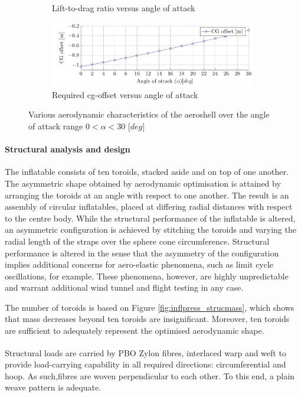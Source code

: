 \begin{figure}[h]
\begin{subfigure}[b]{0.49\textwidth}
 		\caption{Lift-to-drag ratio versus angle of attack}
 		\label{fig:CLCDAlpha}
 	\end{subfigure}
 	\begin{subfigure}[b]{0.49\textwidth}
 		\includegraphics[width=0.99\textwidth]{./Figure/Aerodynamics/CGoAlpha.pdf}
 		\caption{Required \gls{cg}-offset versus angle of attack}
 		\label{fig:CGOAlpha}
 	\end{subfigure}
 	\caption{Various aerodynamic characteristics of the aeroshell over the angle of attack range $0<\alpha<30$ [$deg$]}
 \end{figure}


\paragraph{Structural analysis and design}


The inflatable consists of ten toroids, stacked aside and on top of one another. The asymmetric shape obtained by aerodynamic optimisation is attained by arranging the toroids at an angle with respect to one another. The result is an assembly of circular inflatables, placed at differing radial distances with respect to the centre body. While the structural performance of the inflatable is altered, an asymmetric configuration is achieved by stitching the toroids and varying the radial length of the straps over the sphere cone circumference. Structural performance is altered in the sense that the asymmetry of the configuration implies additional concerns for aero-elastic phenomena, such as limit cycle oscillations, for example. These phenomena, however, are highly unpredictable and warrant additional wind tunnel and flight testing in any case. 

The number of toroids is based on Figure \ref{fig:inflpress_strucmass}, which shows that mass decreases beyond ten toroids are insignificant. Moreover, ten toroids are sufficient to adequately represent the optimised aerodynamic shape. 

Structural loads are carried by PBO Zylon\textsuperscript{\textregistered} fibres, interlaced warp and weft to provide load-carrying capability in all required directions: circumferential and hoop. As such,fibres are woven perpendicular to each other. To this end, a plain weave pattern is adequate.

